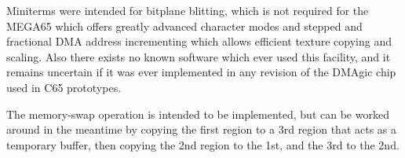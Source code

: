 Miniterms were intended for bitplane blitting,
which is not required for the MEGA65 which offers greatly advanced
character modes and stepped and fractional DMA address incrementing
which allows efficient texture copying and scaling. Also there exists
no known software which ever used this facility, and it remains
uncertain if it was ever implemented in any revision of the DMAgic
chip used in C65 prototypes.

The memory-swap
operation is intended to be implemented, but can be worked around in
the meantime by copying the first region to a 3rd region that acts as
a temporary buffer, then copying the 2nd region to the 1st, and the
3rd to the 2nd.
